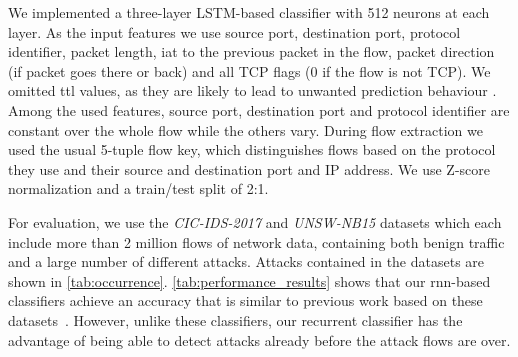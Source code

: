 \documentclass[conference]{IEEEtran}
\begin{document}
We implemented a three-layer LSTM-based classifier with 512 neurons at each layer. As the input features we use
source port, destination port, protocol identifier, packet length, \gls{iat} to the previous packet in the flow, packet direction (if packet goes there or back) and all TCP flags (0 if the flow is not TCP).
We omitted \gls{ttl} values, as they are likely to lead to unwanted prediction behaviour \cite{bachl_walling_2019}.  Among the used features, source port, destination port and protocol identifier are constant over the whole flow while the others vary.
During flow extraction we used the usual 5-tuple flow key, which distinguishes flows based on the protocol they use and their source and destination port and IP address.
We use Z-score normalization and a train/test split of 2:1.

For evaluation, we use the \textit{CIC-IDS-2017} \cite{sharafaldin_toward_2018} and \textit{UNSW-NB15} \cite{moustafa_unsw-nb15:_2015} datasets which each include more than 2 million flows of network data, containing both benign traffic and a large number of different attacks. Attacks contained in the datasets are shown in \autoref{tab:occurrence}.
\autoref{tab:performance_results} shows that our \gls{rnn}-based classifiers achieve an accuracy that is similar to previous work based on these datasets~\cite{meghdouri_analysis_2018,bachl_walling_2019}. However, unlike these classifiers, our recurrent classifier has the advantage of being able to detect attacks already before the attack flows are over.
\end{document}

